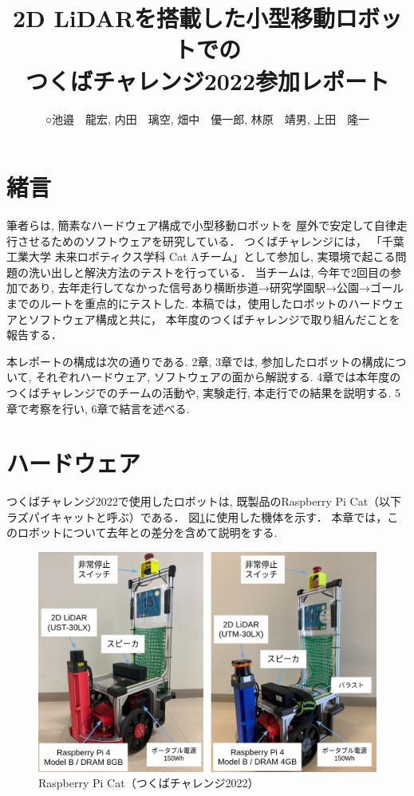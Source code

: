 \documentclass[twocolumn,9pt]{jsproceedings}
\title{2D LiDARを搭載した小型移動ロボットでの\\つくばチャレンジ2022参加レポート}
\author{○池邉　龍宏\authorrefmark{1}, 内田　璃空\authorrefmark{1}, 畑中　優一郎\authorrefmark{1}, 林原　靖男\authorrefmark{1}, 上田　隆一\authorrefmark{1}}
\affiliation{千葉工業大学 未来ロボティクス学科 Cat Aチーム}
\begin{document}
\maketitle


\section{緒言}
筆者らは, 簡素なハードウェア構成で小型移動ロボットを
屋外で安定して自律走行させるためのソフトウェアを研究している．
つくばチャレンジには，
「千葉工業大学 未来ロボティクス学科 Cat Aチーム」として参加し, 
実環境で起こる問題の洗い出しと解決方法のテストを行っている．
当チームは, 今年で2回目の参加であり, 去年走行してなかった信号あり横断歩道→研究学園駅→公園→ゴール
までのルートを重点的にテストした.
本稿では，使用したロボットのハードウェアとソフトウェア構成と共に，
本年度のつくばチャレンジで取り組んだことを報告する．

本レポートの構成は次の通りである. 
2章, 3章では, 参加したロボットの構成について, 
それぞれハードウェア, ソフトウェアの面から解説する. 
4章では本年度のつくばチャレンジでのチームの活動や, 
実験走行, 本走行での結果を説明する. 
5章で考察を行い, 6章で結言を述べる. 

\section{ハードウェア}

つくばチャレンジ2022で使用したロボットは, 
既製品のRaspberry Pi Cat（以下ラズパイキャットと呼ぶ）\cite{RTshop}である．
図\ref{fig:raspicat}に使用した機体を示す．
本章では，このロボットについて去年との差分を含めて説明をする.

\begin{figure}[h]
	\begin{center}
		\includegraphics[width=0.8\linewidth]{figs/raspicat.pdf}
		\caption{Raspberry Pi Cat（つくばチャレンジ2022）}
		\label{fig:raspicat}
	\end{center}
\end{figure}
\end{document}
